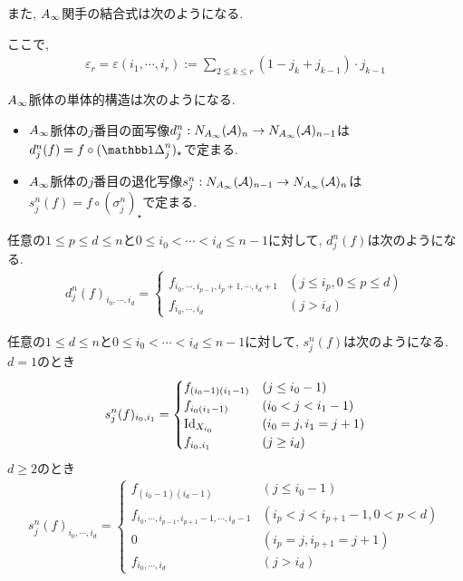\documentclass[uplatex, a4paper, 14Q, dvipdfmx]{jsarticle}
\begin{document}
また, $A_{\infty}$関手の結合式は次のようになる. 

\begin{remark}[執筆中]
  ここで, 
  \begin{align*}
    \varepsilon_r = \varepsilon(i_1,\cdots,i_r)
    := \sum_{2 \leq k \leq r} (1-j_k+j_{k-1}) \cdot j_{k-1} 
  \end{align*}
\end{remark}

\begin{remark} \label{rem_face_map_of_Ainf_nerve}
  $A_{\infty}$脈体の単体的構造は次のようになる. 
  \begin{itemize}
    \item $A_{\infty}$脈体の$j$番目の面写像$d^n_j : N_{A_{\infty}}(\mathcal{A})_n \to N_{A_{\infty}}(\mathcal{A})_{n-1}$は$d^n_j(f)= f \circ (\Prism^n_j)_\star$で定まる.
    \item $A_{\infty}$脈体の$j$番目の退化写像$s^n_j : N_{A_{\infty}}(\mathcal{A})_{n-1} \to N_{A_{\infty}}(\mathcal{A})_n$は$s^n_j(f)= f \circ (\sigma^n_j)_\star$で定まる.
  \end{itemize}
\end{remark}

\begin{lemma}
  任意の$1 \leq p \leq d \leq n$と$0 \leq i_0 < \cdots < i_d \leq n-1$に対して, $d^n_j(f)$は次のようになる. 
  \begin{align*}
    d^n_j(f)_{i_0,\cdots,i_d} = 
    \begin{cases}
      f_{i_0,\cdots,i_{p-1},i_{p}+1,\cdots,i_{d}+1} & (j \leq i_p, 0 \leq p \leq d) \\
      f_{i_0,\cdots,i_d} & (j > i_d)
    \end{cases}
  \end{align*}
\end{lemma}

\begin{lemma}
  任意の$1 \leq d \leq n$と$0 \leq i_0 < \cdots < i_d \leq n-1$に対して, $s^n_j(f)$は次のようになる. \\
  $d=1$のとき
  \begin{align*}
    s^n_j(f)_{i_0,i_1} = 
    \begin{cases}
      f_{(i_0-1)(i_1-1)} & (j \leq i_0-1) \\
      f_{i_0(i_1-1)} & (i_0 < j < i_1-1) \\
      \mathrm{Id}_{X_{i_0}} & (i_0=j, i_1=j+1) \\
      f_{i_0,i_1} & (j \geq i_d)
    \end{cases}
  \end{align*}
  $d \geq 2$のとき
  \begin{align*}
    s^n_j(f)_{i_0,\cdots,i_d} = 
    \begin{cases}
      f_{(i_0-1)(i_d-1)} & (j \leq i_0-1) \\
      f_{i_0,\cdots,i_{p-1},i_{p+1}-1,\cdots,i_{d}-1} & (i_p < j < i_{p+1}-1, 0 < p < d) \\
      0 & (i_p=j, i_{p+1}=j+1) \\
      f_{i_0,\cdots,i_d} & (j > i_d)
    \end{cases}
  \end{align*}
\end{lemma}
\end{document}
